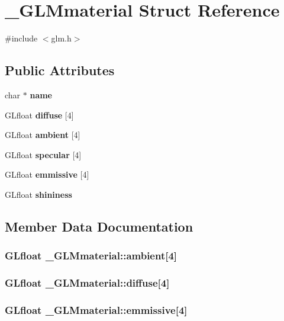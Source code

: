 \section{\-\_\-\-G\-L\-Mmaterial Struct Reference}
\label{struct___g_l_mmaterial}


{\ttfamily \#include $<$glm.\-h$>$}

\subsection*{Public Attributes}
\begin{DoxyCompactItemize}
\item 
char $\ast$ {\bf name}
\item 
G\-Lfloat {\bf diffuse} [4]
\item 
G\-Lfloat {\bf ambient} [4]
\item 
G\-Lfloat {\bf specular} [4]
\item 
G\-Lfloat {\bf emmissive} [4]
\item 
G\-Lfloat {\bf shininess}
\end{DoxyCompactItemize}


\subsection{Member Data Documentation}
\subsubsection[{ambient}]{\setlength{\rightskip}{0pt plus 5cm}G\-Lfloat \-\_\-\-G\-L\-Mmaterial\-::ambient[4]}\label{struct___g_l_mmaterial_a5009f171fe38cc6da03b637efa1fb116}
\subsubsection[{diffuse}]{\setlength{\rightskip}{0pt plus 5cm}G\-Lfloat \-\_\-\-G\-L\-Mmaterial\-::diffuse[4]}\label{struct___g_l_mmaterial_a4602d91041b40f1f95f426ee5d71fc89}
\subsubsection[{emmissive}]{\setlength{\rightskip}{0pt plus 5cm}G\-Lfloat \-\_\-\-G\-L\-Mmaterial\-::emmissive[4]}\label{struct___g_l_mmaterial_af105c3b731c0f2fe8230d6667455e18b}
